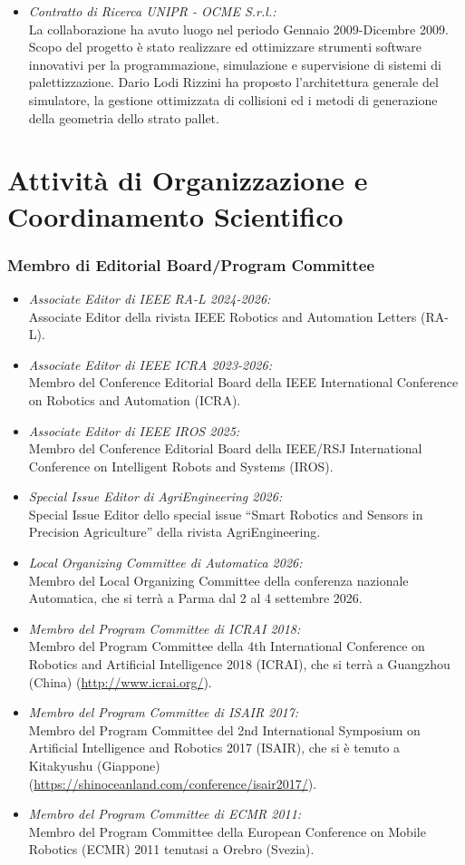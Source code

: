\documentclass[11pt]{article}
\newcommand{\ITEMDATE}[1]{\item \textit{#1:}\\}
\begin{document}
\begin{itemize}
\begin{itemize}
\ITEMDATE{Contratto di Ricerca UNIPR - OCME S.r.l.}
La collaborazione ha avuto luogo nel periodo Gennaio 2009-Dicembre 2009. 
Scopo del progetto \`e stato realizzare ed ottimizzare strumenti software innovativi per 
la programmazione, simulazione e supervisione di sistemi di palettizzazione.
Dario Lodi Rizzini ha proposto l'architettura generale del simulatore, la gestione 
ottimizzata di collisioni ed i metodi di generazione della geometria dello strato pallet.

\end{itemize}


\section*{Attivit\`a di Organizzazione e Coordinamento Scientifico}


\subsubsection*{Membro di Editorial Board/Program Committee}

\begin{itemize}
\ITEMDATE{Associate Editor di IEEE RA-L 2024-2026}
Associate Editor della rivista IEEE Robotics and Automation Letters (RA-L). 
\ITEMDATE{Associate Editor di IEEE ICRA 2023-2026}
Membro del Conference Editorial Board della IEEE International Conference on Robotics and Automation (ICRA).
\ITEMDATE{Associate Editor di IEEE IROS 2025}
Membro del Conference Editorial Board della IEEE/RSJ International Conference on Intelligent Robots and Systems (IROS).
\ITEMDATE{Special Issue Editor di AgriEngineering 2026} 
Special Issue Editor dello special issue ``Smart Robotics and Sensors in Precision Agriculture'' della rivista AgriEngineering.
\ITEMDATE{Local Organizing Committee di Automatica 2026}
Membro del Local Organizing Committee della conferenza nazionale Automatica,  
che si terr\`a a Parma dal 2 al 4 settembre 2026. 
\ITEMDATE{Membro del Program Committee di ICRAI 2018}
Membro del Program Committee della 4th International Conference on Robotics and Artificial Intelligence 2018 (ICRAI),  
che si terr\`a a Guangzhou (China) ({\footnotesize \url{http://www.icrai.org/}}). 
\ITEMDATE{Membro del Program Committee di ISAIR 2017}
Membro del Program Committee del 2nd International Symposium on Artificial Intelligence and Robotics 2017 (ISAIR),  
che si \`e tenuto a Kitakyushu (Giappone) \\
({\footnotesize \url{https://shinoceanland.com/conference/isair2017/}}). 
\ITEMDATE{Membro del Program Committee di ECMR 2011}
Membro del Program Committee della European Conference on Mobile Robotics (ECMR) 2011
tenutasi a Orebro (Svezia). 
\end{itemize}



\end{itemize}
\end{document}
